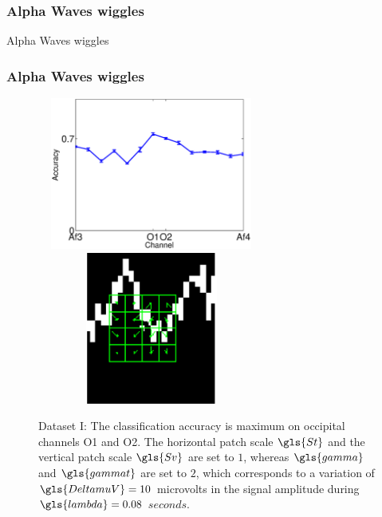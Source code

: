 \documentclass[aspectratio=169]{beamer}
\begin{document}
\begin{frame}
\frametitle{Alpha Waves wiggles}
\begin{center}
\LARGE Alpha Waves wiggles
\end{center}
\end{frame}


\begin{frame}
\frametitle{Alpha Waves wiggles}
\begin{figure}[h!]
\centering
\includegraphics[width=7.5cm, height=5cm]{images/Dataset1AccuracyPerChannel}
\includegraphics[width=7.5cm, height=5cm]{images/AlphaWaveSampleEEG.png}
\caption[Dataset I Classification Rate]{Dataset I: The classification accuracy is maximum on occipital channels O1 and O2. The horizontal patch scale $\gls{St}$ and the vertical patch scale $\gls{Sv}$ are set to $1$, whereas $\gls{gamma}$ and $\gls{gammat}$ are set to $2$, which corresponds to a variation of $\gls{DeltamuV} = 10$ microvolts in the signal amplitude during $\gls{lambda}=0.08$ $\si{seconds}$.}
\label{fig:alpharesultsdataseti}
\end{figure}
\end{frame}
\end{document}
